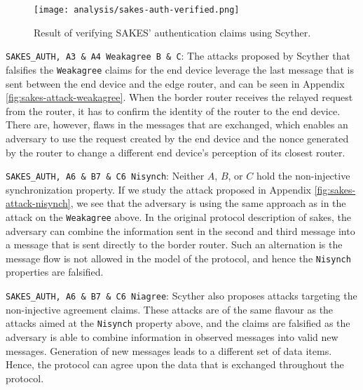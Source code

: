 \begin{figure}[h]
	\centering
	\texttt{[image: analysis/sakes-auth-verified.png]}
	\caption{Result of verifying SAKES' authentication claims using Scyther.}
	\label{fig:sakes-verified-auth}
\end{figure}

\newpage

\begin{list}{•}{}

\item \texttt{SAKES\_AUTH, A3 \& A4 Weakagree B \& C}: The attacks proposed by Scyther that falsifies the \texttt{Weakagree} claims for the end device leverage the last message that is sent between the end device and the edge router, and can be seen in Appendix \ref{fig:sakes-attack-weakagree}. When the border router receives the relayed request from the router, it has to confirm the identity of the router to the end device. There are, however, flaws in the messages that are exchanged, which enables an adversary to use the request created by the end device and the nonce generated by the router to change a different end device's perception of its closest router.

\item \texttt{SAKES\_AUTH, A6 \& B7 \& C6 Nisynch}: Neither $A$, $B$, or $C$ hold the non-injective synchronization property. If we study the attack proposed in Appendix \ref{fig:sakes-attack-nisynch}, we see that the adversary is using the same approach as in the attack on the \texttt{Weakagree} above. In the original protocol description of \gls{sakes}, the adversary can combine the information sent in the second and third message into a message that is sent directly to the border router. Such an alternation is the message flow is not allowed in the model of the protocol, and hence the \texttt{Nisynch} properties are falsified.

\item \texttt{SAKES\_AUTH, A6 \& B7 \& C6 Niagree}: Scyther also proposes attacks targeting the non-injective agreement claims. These attacks are of the same flavour as the attacks aimed at the \texttt{Nisynch} property above, and the claims are falsified as the adversary is able to combine information in observed messages into valid new messages. Generation of new messages leads to a different set of data items. Hence, the protocol can agree upon the data that is exchanged throughout the protocol.

\end{list}



